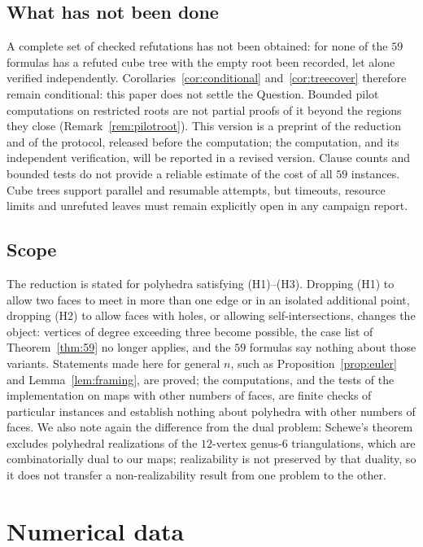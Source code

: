 \documentclass[11pt,reqno]{amsart}
\theoremstyle{plain}
\theoremstyle{definition}
\begin{document}
\subsection{What has not been done}
A complete set of checked refutations has not been obtained: for none of the $59$ formulas has a
refuted cube tree with the empty root been recorded, let alone verified independently.
Corollaries~\ref{cor:conditional} and~\ref{cor:treecover} therefore remain conditional: this paper
does not settle the Question. Bounded pilot computations on restricted roots are not partial
proofs of it beyond the regions they close (Remark~\ref{rem:pilotroot}). This version is a preprint
of the reduction and of the protocol, released before the computation; the computation, and its
independent verification, will be reported in a revised version. Clause counts and bounded tests do
not provide a reliable estimate of the cost of all $59$ instances. Cube trees support parallel and
resumable attempts, but timeouts, resource limits and unrefuted leaves must remain explicitly open
in any campaign report.

\subsection{Scope}
The reduction is stated for polyhedra satisfying (H1)--(H3). Dropping (H1) to allow two faces to meet
in more than one edge or in an isolated additional point, dropping (H2) to allow faces with holes, or
allowing self-intersections, changes the object: vertices of degree exceeding three become possible,
the case list of Theorem~\ref{thm:59} no longer applies, and the $59$ formulas say nothing about those
variants. Statements made here for general $n$, such as Proposition~\ref{prop:euler} and
Lemma~\ref{lem:framing}, are proved; the computations, and the tests of the implementation on maps
with other numbers of faces, are finite checks of particular instances and establish nothing about
polyhedra with other numbers of faces. We also note again the difference from the dual problem: Schewe's theorem
\cite{Schewe2010} excludes polyhedral realizations of the $12$-vertex genus-$6$ triangulations, which
are combinatorially dual to our maps; realizability is not preserved by that duality, so it does not transfer
a non-realizability result from one problem to the other.

\appendix

\section{Numerical data}\label{app:numbers}
\end{document}
